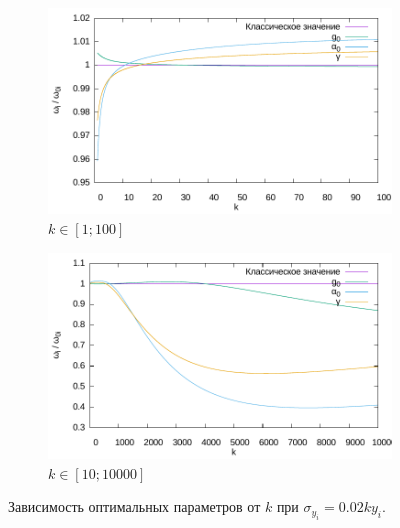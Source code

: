\documentclass[11pt,a4paper]{article}
\begin{document}
\begin{figure}[h]
  \centering
  \begin{subfigure}[b]{0.5\textwidth}
    \includegraphics[width=\textwidth]{figs/levmar/convergence/varY/convergence_100.txt.pdf}
	\caption{$k \in [1; 100]$}
	\label{fig:conv_varY_100}
  \end{subfigure}%
  \begin{subfigure}[b]{0.5\textwidth}
    \includegraphics[width=\textwidth]{figs/levmar/convergence/varY/convergence_10000.txt.pdf}
	\caption{$k \in [10; 10000]$}
	\label{fig:conv_varY_10000}
  \end{subfigure}
  \caption{Зависимость оптимальных параметров от $k$ при $\sigma_{y_i} = 0.02ky_i$.}
  \label{fig:conv_varY}
\end{figure}
\end{document}
